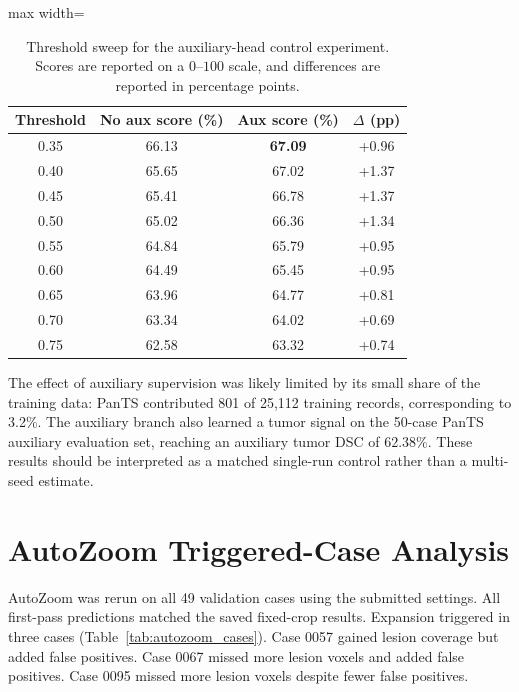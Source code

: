 \begin{table}[t]
\centering
\caption{
Threshold sweep for the auxiliary-head control experiment.
Scores are reported on a \(0\)--\(100\) scale, and differences are reported in percentage points.
}
\label{tab:aux_head_threshold_sweep}
\begin{adjustbox}{max width=\linewidth}
\begin{tabular}{cccc}
\toprule
\textbf{Threshold} & \textbf{No aux score (\%)} & \textbf{Aux score (\%)} & \textbf{\(\Delta\) (pp)} \\
\midrule
0.35 & 66.13 & \textbf{67.09} & +0.96 \\
0.40 & 65.65 & 67.02 & +1.37 \\
0.45 & 65.41 & 66.78 & +1.37 \\
0.50 & 65.02 & 66.36 & +1.34 \\
0.55 & 64.84 & 65.79 & +0.95 \\
0.60 & 64.49 & 65.45 & +0.95 \\
0.65 & 63.96 & 64.77 & +0.81 \\
0.70 & 63.34 & 64.02 & +0.69 \\
0.75 & 62.58 & 63.32 & +0.74 \\
\bottomrule
\end{tabular}
\end{adjustbox}
\end{table}

The effect of auxiliary supervision was likely limited by its small share of the training data: PanTS contributed 801 of 25,112 training records, corresponding to 3.2\%. The auxiliary branch also learned a tumor signal on the 50-case PanTS auxiliary evaluation set, reaching an auxiliary tumor DSC of \(62.38\%\). These results should be interpreted as a matched single-run control rather than a multi-seed estimate.

\section{AutoZoom Triggered-Case Analysis}
\label{app:autozoom_cases}

AutoZoom was rerun on all 49 validation cases using the submitted settings. All first-pass predictions matched the saved fixed-crop results. Expansion triggered in three cases (Table~\ref{tab:autozoom_cases}). Case 0057 gained lesion coverage but added false positives. Case 0067 missed more lesion voxels and added false positives. Case 0095 missed more lesion voxels despite fewer false positives.

